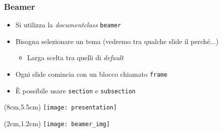 \begin{frame}
  
  \frametitle{Beamer}
  
  \begin{itemize}
   \item Si utilizza la \textit{documentclass} \texttt{beamer}
   \item Bisogna selezionare un tema (vedremo tra qualche slide il perché...)
   \begin{itemize}
    \item Larga scelta tra quelli di \textit{default}
   \end{itemize}
   \item Ogni slide comincia con un blocco chiamato \texttt{frame}
   \item È possibile usare \texttt{section} e \texttt{subsection}
  \end{itemize}
  
  \begin{textblock*}{5cm}(8cm,5.5cm)
    \texttt{[image: presentation]}
  \end{textblock*}
 
  \begin{textblock*}{5cm}(2cm,1.2cm)
    \texttt{[image: beamer\_img]}
  \end{textblock*}

\end{frame}
